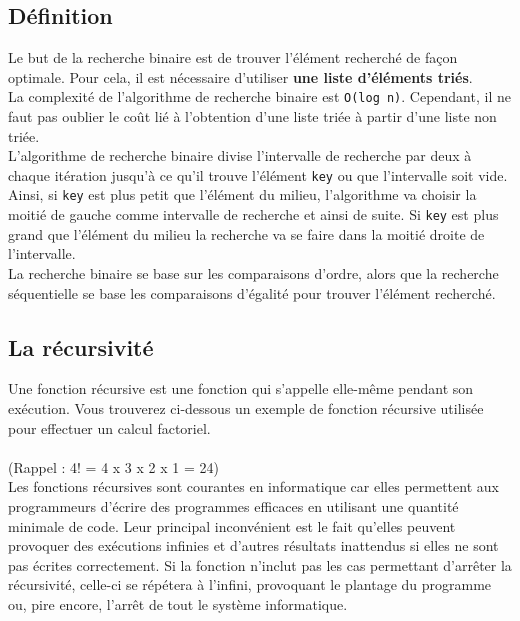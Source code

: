     \subsection{Définition}
    
    Le but de la recherche binaire est de trouver l'élément recherché de façon optimale. Pour cela, il est nécessaire d'utiliser \textbf{une liste d'éléments triés}.\\
    
    La complexité de l'algorithme de recherche binaire est \lstinline{O(log n)}. Cependant, il ne faut pas oublier le coût lié à l'obtention d'une liste triée à partir d'une liste non triée.\\
    
    L'algorithme de recherche binaire divise l'intervalle de recherche par deux à chaque itération jusqu'à ce qu'il trouve l'élément \lstinline{key} ou que l'intervalle soit vide.\\
    
    Ainsi, si \lstinline{key} est plus petit que l'élément du milieu, l'algorithme va choisir la moitié de gauche comme intervalle de recherche et ainsi de suite. Si \lstinline{key} est plus grand que l'élément du milieu la recherche va se faire dans la moitié droite de l'intervalle.\\
    
    La recherche binaire se base sur les comparaisons d'ordre, alors que la recherche séquentielle se base les comparaisons d'égalité pour trouver l'élément recherché.\\
    
    \subsection{La récursivité}
    
    Une fonction récursive est une fonction qui s'appelle elle-même pendant son exécution. Vous trouverez ci-dessous un exemple de fonction récursive utilisée pour effectuer un calcul factoriel.\\\\
    (Rappel : 4! = 4 x 3 x 2 x 1 = 24)\\
    
    
    
    Les fonctions récursives sont courantes en informatique car elles permettent aux programmeurs d'écrire des programmes efficaces en utilisant une quantité minimale de code. Leur principal inconvénient est le fait qu'elles peuvent provoquer des exécutions infinies et d'autres résultats inattendus si elles ne sont pas écrites correctement. Si la fonction n'inclut pas les cas permettant d'arrêter la récursivité, celle-ci se répétera à l'infini, provoquant le plantage du programme ou, pire encore, l'arrêt de tout le système informatique.\\
       
